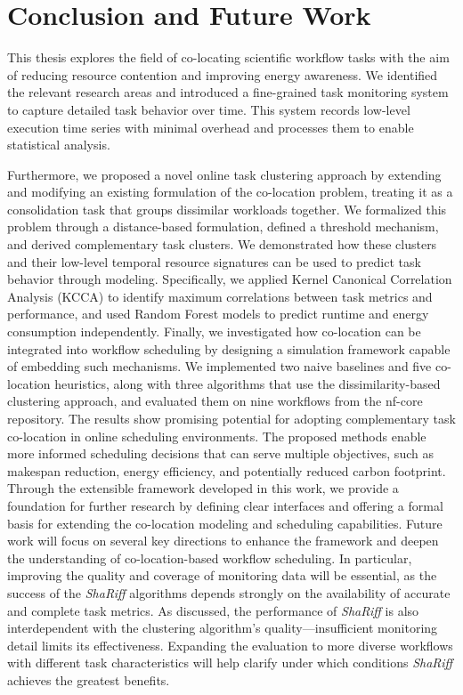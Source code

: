 \section{Conclusion and Future Work}
\label{cha:conclusionfuturework}
This thesis explores the field of co-locating scientific workflow tasks with the aim of reducing resource contention and improving energy awareness. We identified the relevant research areas and introduced a fine-grained task monitoring system to capture detailed task behavior over time. This system records low-level execution time series with minimal overhead and processes them to enable statistical analysis.

Furthermore, we proposed a novel online task clustering approach by extending and modifying an existing formulation of the co-location problem, treating it as a consolidation task that groups dissimilar workloads together. We formalized this problem through a distance-based formulation, defined a threshold mechanism, and derived complementary task clusters. We demonstrated how these clusters and their low-level temporal resource signatures can be used to predict task behavior through modeling. Specifically, we applied Kernel Canonical Correlation Analysis (KCCA) to identify maximum correlations between task metrics and performance, and used Random Forest models to predict runtime and energy consumption independently.
Finally, we investigated how co-location can be integrated into workflow scheduling by designing a simulation framework capable of embedding such mechanisms. We implemented two naive baselines and five co-location heuristics, along with three algorithms that use the dissimilarity-based clustering approach, and evaluated them on nine workflows from the nf-core repository.
The results show promising potential for adopting complementary task co-location in online scheduling environments. The proposed methods enable more informed scheduling decisions that can serve multiple objectives, such as makespan reduction, energy efficiency, and potentially reduced carbon footprint.
Through the extensible framework developed in this work, we provide a foundation for further research by defining clear interfaces and offering a formal basis for extending the co-location modeling and scheduling capabilities.
Future work will focus on several key directions to enhance the framework and deepen the understanding of co-location-based workflow scheduling. In particular, improving the quality and coverage of monitoring data will be essential, as the success of the \textit{ShaRiff} algorithms depends strongly on the availability of accurate and complete task metrics. As discussed, the performance of \textit{ShaRiff} is also interdependent with the clustering algorithm's quality—insufficient monitoring detail limits its effectiveness. Expanding the evaluation to more diverse workflows with different task characteristics will help clarify under which conditions \textit{ShaRiff} achieves the greatest benefits.
